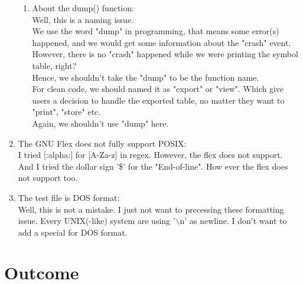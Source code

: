 \documentclass[12pt,a4paper]{article}
\begin{document}
\begin{CJK}{UTF8}{bsmi}
\begin{enumerate}
\begin{enumerate}
                  \item About the dump() function:\\
                        Well, this is a naming issue.\\
                        We use the word "dump" in programming, that means some error(s)
                        happened, and we would get some information about the "crash" event.
                        However, there is no "crash" happened while we were printing the
                        symbol table, right?\\
                        Hence, we shouldn't take the "dump" to be the function name.\\
                        For clean code, we should named it as "export" or "view". Which
                        give users a decision to handle the exported table, no matter they
                        want to "print", "store" etc.\\
                        Again, we shouldn't use "dump" here.
              \end{enumerate}

        \item The GNU Flex does not fully support POSIX:\\
              I tried $[$:alpha:$]$ for $[$A-Za-z$]$ in regex. However, the flex does
              not support.\\
              And I tried the dollar sign '\$' for the "End-of-line". How ever the flex
              does not support too.

        \item The test file is DOS format:\\
              Well, this is not a mistake. I just not want to precessing these formatting issue.
              Every UNIX(-like) system are using '$\backslash$n' as newline. I don't want
              to add a special for DOS format.
    \end{enumerate}

    \section{Outcome}
    

\end{CJK}
\end{document}

